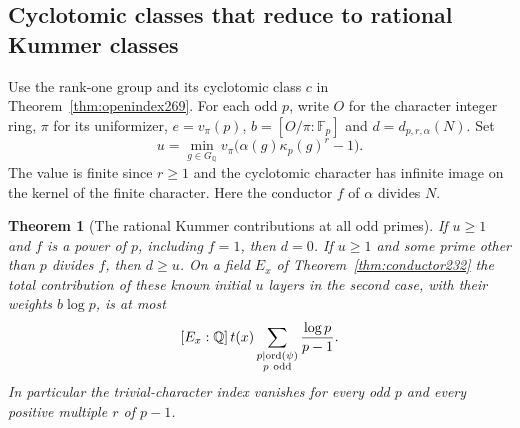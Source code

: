 \documentclass[a4paper,11pt]{article}
\newtheorem{theorem}[proposition]{Theorem}
\theoremstyle{definition}
\theoremstyle{remark}
\numberwithin{equation}{section}
\begin{document}
\subsection{Cyclotomic classes that reduce to rational Kummer classes}\label{nav:III-50}
Use the rank-one group and its cyclotomic class \(c\) in
Theorem~\ref{thm:openindex269}. For each odd \(p\), write \(O\)
for the character integer ring, \(\pi\) for its uniformizer,
\(e=v_\pi(p)\), \(b=[O/\pi:\mathbb F_p]\) and
\(d=d_{p,r,\alpha}(N)\). Set
\[
       u=\min_{g\in G_{\mathbb Q}}v_\pi
                          \bigl(\alpha(g)\kappa_p(g)^r-1\bigr).
\]
The value is finite since \(r\ge1\) and the cyclotomic character
has infinite image on the kernel of the finite character.
Here the conductor \(f\) of \(\alpha\) divides \(N\).

\begin{theorem}[The rational Kummer contributions at all odd primes]\leavevmode
\label{thm:kummer273}
If \(u\ge1\) and \(f\) is a power of \(p\), including \(f=1\),
then \(d=0\). If \(u\ge1\) and some prime other than \(p\) divides
\(f\), then \(d\ge u\). On a field \(E_x\) of
Theorem~\ref{thm:conductor232} the total contribution of these
known initial \(u\) layers in the second case, with their weights
\(b\log p\), is at most
\[
   [E_x:\mathbb Q]\,t(x)
       \sum_{\substack{p\mid\operatorname{ord}(\psi)\\p\ {\rm odd}}}
                          \frac{\log p}{p-1}.
\]
In particular the trivial-character index vanishes for every odd
\(p\) and every positive multiple \(r\) of \(p-1\).
\end{theorem}
\end{document}
